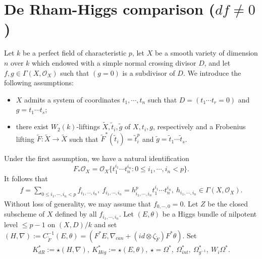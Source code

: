 \documentclass[12pt, a4paper]{article}
\begin{document}
\section{De Rham-Higgs comparison ($df\neq0$)}

Let $k$ be a perfect field of characteristic $p$, let $X$ be a smooth variety of dimension $n$ over $k$ which endowed with a simple normal crossing divisor $D$, and let $f,g\in\Gamma(X,\mathcal O_X)$ such that $(g=0)$ is a subdivisor of $D$. We introduce the following assumptions:
\begin{itemize}
    \item[(S1)\ ] $X$ admits a system of coordinates $t_1,\cdots,t_n$ such that $D=(t_1\cdots t_r=0)$ and $g=t_1\cdots t_s$;
    \item[(S2)\ ] there exist $W_2(k)$-liftings $\tilde X,\tilde t_i,\tilde g$ of $X,t_i,g$, respectively and a Frobenius lifting $\tilde F:\tilde X\to \tilde X$ such that $\tilde F^*(\tilde t_i)=\tilde t_i^p$ and $\tilde g=\tilde t_1\cdots\tilde t_s$. 
\end{itemize}
Under the first assumption, we have a natural identification
$$
F_*\mathcal O_X=\mathcal O_X\{t_1^{i_1}\cdots t_n^{i_n}:0\leq i_1,\cdots,i_n<p\}.
$$
It follows that 
\begin{eqnarray}\label{decom f}
f=\sum_{0\leq i_1,\cdots,i_n<p}f_{i_1,\cdots,i_n},~f_{i_1,\cdots,i_n}=h_{i_1,\cdots,i_n}^pt_1^{i_1}\cdots t_n^{i_n},~h_{i_1,\cdots,i_n}\in\Gamma(X,\mathcal O_X).
\end{eqnarray}
Without loss of generality, we may assume that $f_{0,\cdots,0}=0$. Let $Z$ be the closed subscheme of $X$ defined by all $f_{i_1,\cdots,i_n}$. Let $(E,\theta)$ be a Higgs bundle of nilpotent level $\leq p-1$ on $(X,D)/k$ and set $(H,\nabla):=C^{-1}_{\tilde F}(E,\theta)=(F^*E,\nabla_{can}+(id\otimes\zeta_{\tilde F})F^*\theta)$. Set 
\begin{eqnarray}\label{MHM complex}
K^*_{dR}:=\star(H,\nabla),~K^*_{Hig}:=\star(E,\theta),~\star=\Omega^*,~\Omega^*_{int},~\Omega^*_{g^{-1}},~W_i\Omega^*.
\end{eqnarray}
\end{document}
